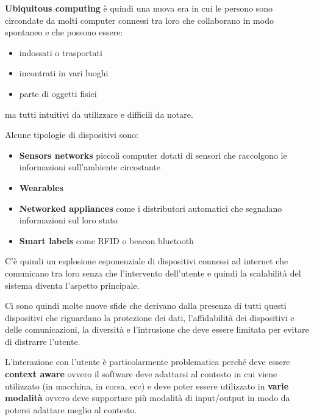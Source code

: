 \textbf{Ubiquitous computing} è quindi una nuova era in cui le persono
sono circondate da molti computer connessi tra loro che collaborano in
modo spontaneo e che possono essere:

\begin{itemize}
\item indossati o trasportati

\item incontrati in vari luoghi

\item parte di oggetti fisici

\end{itemize}

ma tutti intuitivi da utilizzare e difficili da notare.

Alcune tipologie di dispositivi sono:

\begin{itemize}
\item \textbf{Sensors networks} piccoli computer dotati di sensori che
  raccolgono le informazioni sull'ambiente circostante

\item \textbf{Wearables}

\item \textbf{Networked appliances} come i distributori automatici che
  segnalano informazioni sul loro stato

\item \textbf{Smart labels} come RFID o beacon bluetooth

\end{itemize}

C'è quindi un esplosione esponenziale di dispositivi connessi ad
internet che comunicano tra loro senza che l'intervento dell'utente e
quindi la scalabilità del sistema diventa l'aspetto principale.

Ci sono quindi molte nuove sfide che derivano dalla presenza di tutti
questi dispositivi che riguardano la protezione dei dati, l'affidabilità
dei dispositivi e delle comunicazioni, la diversità e l'intrusione che
deve essere limitata per evitare di distrarre l'utente.

L'interazione con l'utente è particolarmente problematica perché deve
essere \textbf{context aware} ovvero il software deve adattarsi al
contesto in cui viene utilizzato (in macchina, in corsa, ecc) e deve
poter essere utilizzato in \textbf{varie modalità} ovvero deve
supportare più modalità di input/output in modo da potersi adattare
meglio al contesto.

